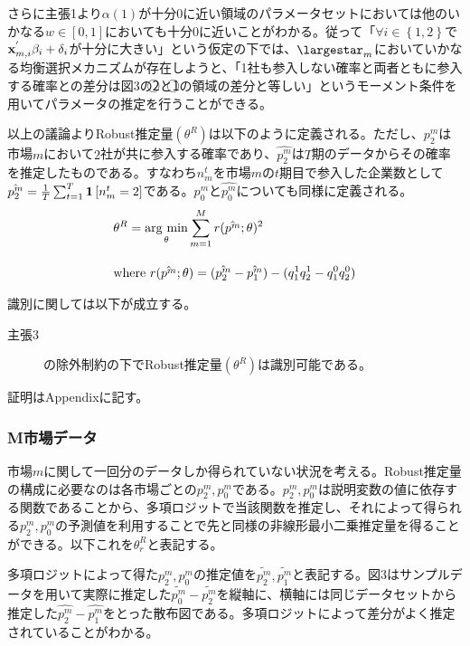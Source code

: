 \documentclass{jsarticle}
\newcommand{\argmin}{\mathop{\rm arg~min}\limits}
\begin{document}
さらに主張1より$\alpha(1)$が十分0に近い領域のパラメータセットにおいては他のいかなる$w \in [0,1]$においても十分0に近いことがわかる。従って「$\forall i \in \left\{ 1,2\right\}$で${\bf x}_{m, i}^{'} \beta_i + \delta_i$が十分に大きい」という仮定の下では、$\largestar_m$においていかなる均衡選択メカニズムが存在しようと、「1社も参入しない確率と両者ともに参入する確率との差分は図3の\textcircled{\scriptsize 2}と\textcircled{\scriptsize 1}の領域の差分と等しい」というモーメント条件を用いてパラメータの推定を行うことができる。

以上の議論よりRobust推定量$(\theta^R)$は以下のように定義される。ただし、$p_2^m$は市場$m$において$2$社が共に参入する確率であり、$\hat{p_2^m}$は$T$期のデータからその確率を推定したものである。すなわち$n_m^t$を市場$m$の$t$期目で参入した企業数として$\hat{p_2^m} = \frac{1}{T} \sum_{t = 1}^T {\bf 1}\left[ n_m^t = 2 \right]$である。$p_0^m$と$\hat{p_0^m}$についても同様に定義される。
\begin{align*}
	&\theta^R = \argmin_{\theta} \sum_{m = 1}^M r(\hat{p^m} ; \theta)^2\\[10pt]
	&\text{where}\ r(\hat{p^m} ; \theta) = (\hat{p_2^m} - \hat{p_1^m}) - (q_1^1 q_2^1 - q_1^0 q_2^0)
\end{align*}

識別に関しては以下が成立する。
\begin{description}
	\item[主張3] \cite{Tamer2003a}の除外制約の下でRobust推定量$(\theta^R)$は識別可能である。
\end{description}
証明はAppendixに記す。

\subsubsection{M市場データ}
市場$m$に関して一回分のデータしか得られていない状況を考える。Robust推定量の構成に必要なのは各市場ごとの$p_2^m,p_0^m$である。$p_2^m,p_0^m$は説明変数の値に依存する関数であることから、多項ロジットで当該関数を推定し、それによって得られる$p_2^m,p_0^m$の予測値を利用することで先と同様の非線形最小二乗推定量を得ることができる。以下これを$\theta_r^R$と表記する。

多項ロジットによって得た$p_2^m,p_0^m$の推定値を$\tilde{p_2^m}, \tilde{p_1^m}$と表記する。図3はサンプルデータを用いて実際に推定した$\tilde{p_0^m} - \tilde{p_2^m}$を縦軸に、横軸には同じデータセットから推定した$\hat{p_2^m} - \hat{p_1^m}$をとった散布図である。多項ロジットによって差分がよく推定されていることがわかる。
\end{document}
